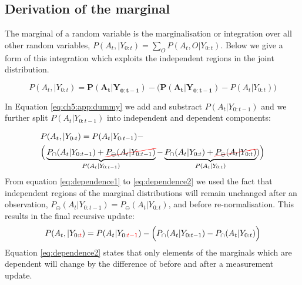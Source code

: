 


\subsection{Derivation of the marginal}\label{appendix:marginal}

The marginal of a random variable is the marginalisation or integration over all other random variables, $P(A_t,|Y_{0:t}) = \sum\limits_{O} P(A_t,O|Y_{0:t})$. Below 
we give a form of this integration which exploits the independent regions in the joint distribution.

\begin{equation} \label{eq:ch5:app:dummy}
 P(A_t,|Y_{0:t}) = \mathbf{P(A_t|Y_{0:t-1})} - \Big(\mathbf{P(A_t|Y_{0:t-1})} - P(A_t|Y_{0:t}) \Big) 
\end{equation}

In Equation \ref{eq:ch5:app:dummy} we add and substract $P(A_t|Y_{0:t-1})$ and we further split 
$P(A_t|Y_{0:t-1})$ into independent and dependent components: 

\begin{align}
  &P(A_t,|Y_{0:t}) =  P(A_t|Y_{0:t-1}) - \nonumber \\ 
  &\Big(\underbrace{P_{\cap}(A_t|Y_{0:t-1}) + \Ccancel[red]{P_{\ominus}(A_t|Y_{0:t-1})}}_{P(A_t|Y_{0:t-1})} -  \underbrace{P_{\cap}(A_t|Y_{0:t}) + \Ccancel[red]{P_{\ominus}(A_t|Y_{0:t})}}_{P(A_t|Y_{0:t})})   \Big) \label{eq:dependence1} 
\end{align}
From equation \ref{eq:dependence1} to \ref{eq:dependence2} we used the fact that independent regions of the marginal distributions will remain unchanged after
an observation, $P_{\ominus}(A_t|Y_{0:t-1}) = P_{\ominus}(A_t|Y_{0:t})$, and before re-normalisation. This results in the final recursive update:
\begin{equation}
 P(A_t,|Y_{0:\color{red}{t}}) =  P(A_t|Y_{0:\color{red}{t-1}}) - \Big(P_{\cap}(A_t|Y_{0:t-1}) -  P_{\cap}(A_t|Y_{0:t})  \Big) \label{eq:dependence2} 
\end{equation}
Equation \ref{eq:dependence2} states that only elements of the marginals which are dependent will change by the difference of before and after 
a measurement update.


